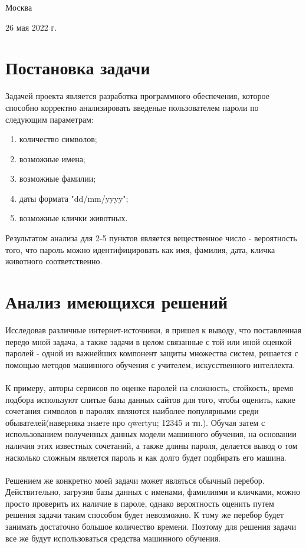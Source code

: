 \documentclass[a4paper,12pt]{article}
\begin{document}
\vspace{\fill}

\begin{center}

Москва

26 мая 2022 г.
\end{center}

\newpage

\tableofcontents

\newpage

\section{Постановка задачи}
Задачей проекта является разработка программного обеспечения, которое способно корректно анализировать введеные пользователем пароли по следующим параметрам:
\begin{enumerate}
\item количество символов; 
\item возможные имена; 
\item возможные фамилии; 
\item даты формата "dd/mm/yyyy"; 
\item возможные клички животных.
\end{enumerate}
Результатом анализа для 2-5 пунктов является вещественное число - вероятность того, что пароль можно идентифицировать как имя, фамилия, дата, кличка животного соответственно.
\newpage

\section{Анализ имеющихся решений}
Исследовав различные интернет-источники, я пришел к выводу, что  поставленная передо мной задача, а также задачи в целом связанные с той или иной оценкой паролей - одной из важнейших компонент защиты множества систем, решается с
помощью методов машинного обучения с учителем, искусственного интеллекта.\\\\ К примеру, авторы сервисов по оценке паролей на сложность, стойкость, время подбора используют слитые базы данных сайтов для того, чтобы оценить, какие сочетания символов в паролях являются наиболее популярными среди обывателей(наверняка знаете про qwertyu; 12345 и тп.). Обучая затем с использованием полученных данных  модели машинного обучения, на основании наличия этих известных сочетаний, а также длины пароля, делается вывод о том насколько сложным является пароль и как долго будет подбирать его машина.\\\\
Решением же конкретно моей задачи может являться обычный перебор. Действительно, загрузив базы данных с именами, фамилиями и кличками, можно просто проверить их наличие в пароле, однако вероятность оценить путем решения задачи таким способом будет невозможно. К тому же перебор будет занимать достаточно большое количество времени. Поэтому для решения задачи все же будут использоваться средства машинного обучения.
\newpage
\end{document}
